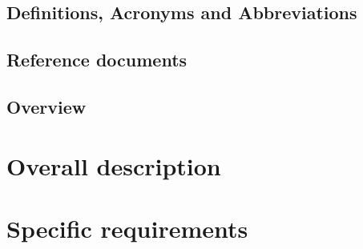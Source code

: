 \documentclass[a4paper,11pt]{report}
\begin{document}
\section{Definitions, Acronyms and Abbreviations}

\section{Reference documents}

\section{Overview}


\chapter*{Overall description}
\addtocounter{chapter}{1}


\chapter*{Specific requirements}
\addtocounter{chapter}{1}
\end{document}
